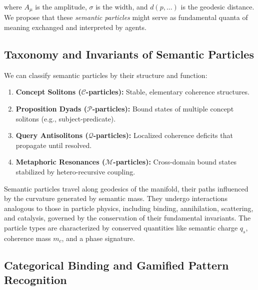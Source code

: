 where \(A_\mu\) is the amplitude, \(\sigma\) is the width, and \(d(p, \dots)\) is the geodesic distance. We propose that these \textit{semantic particles} might serve as fundamental quanta of meaning exchanged and interpreted by agents.


\subsection{Taxonomy and Invariants of Semantic Particles}
\label{13.6.1:taxonomy_and_invariants_of_semantic_particles}

We can classify semantic particles by their structure and function:

\begin{enumerate}

    \item \textbf{Concept Solitons (\(\mathcal{C}\)-particles):} Stable, elementary coherence structures.

    \item \textbf{Proposition Dyads (\(\mathcal{P}\)-particles):} Bound states of multiple concept solitons (e.g., subject-predicate).

    \item \textbf{Query Antisolitons (\(\mathcal{Q}\)-particles):} Localized coherence deficits that propagate until resolved.

    \item \textbf{Metaphoric Resonances (\(\mathcal{M}\)-particles):} Cross-domain bound states stabilized by hetero-recursive coupling.

\end{enumerate}

Semantic particles travel along geodesics of the manifold, their paths influenced by the curvature generated by semantic mass. They undergo interactions analogous to those in particle physics, including binding, annihilation, scattering, and catalysis, governed by the conservation of their fundamental invariants. The particle types are characterized by conserved quantities like semantic charge \(q_s\), coherence mass \(m_c\), and a phase signature.


\subsection{Categorical Binding and Gamified Pattern Recognition}
\label{13.6.2:categorical_binding_and_gamified_pattern_recognition}

